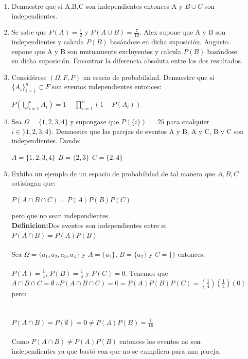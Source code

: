 \documentclass[12pt,a4paper]{report}
\begin{document}
\begin{enumerate}
   \item {
   Demuestre que si A,B,C son independientes entonces A y $B\cup C$ son independientes.
	
    }

   \item {
   Se sabe que $P(A)= \frac{1}{2}$ y $P(A\cup B)=\frac{7}{10}$. Alex supone que A y B son independientes y calcula $P(B)$ basándose en dicha suposición. Augusto supone que A y B son mutuamente excluyentes y calcula $P(B)$ basándose en dicha suposición. Encontrar la diferencia absoluta entre los dos resultados.
	}

   \item {
   Considérese $(\Omega,F, P)$ un esacio de probabilidad. Demuestre que si $\lbrace A_{i} \rbrace _{i=1}^{n} \subset F$ son eventos independientes entonces:\\
   \begin{center}
   $P(\bigcup\limits_{i=1}^{n} A_{i})=1-\prod\limits_{i=1}^{n} (1-P(A_{i}))$
   \end{center}
	}

   \item {
    Sea $\Omega = \lbrace 1,2,3,4 \rbrace$ y supongase que $P(\lbrace i \rbrace)=.25$ para cualquier $i\in \rbrace 1,2,3,4 \rbrace$. Demuestre que las parejas de eventos A y B, A y C, B y C son independientes. Donde:\\
    \begin{center}
    $A=\lbrace 1,2,3,4 \rbrace \ \ B=\lbrace 2,3 \rbrace \ \ C= \lbrace 2,4 \rbrace $
\end{center}     
	}

   \item {
  Exhiba un ejemplo de un espacio de probabilidad de tal manera que $A,B,C$ satisfagan que: \\ 
  \begin{center}
  $P(A\cap B \cap C) = P(A)P(B)P(C)$
  \end{center}
  pero que no sean independientes.\\
  \textbf{Definicion:}Dos eventos son independientes entre si $P(A\cap B)=P(A)P(B)$\\ \\ 
  Sea $\Omega = \lbrace a_{1},a_{2},a_{3},a_{4} \rbrace$
  y $A = \lbrace a_{1} \rbrace$, $B= \lbrace a_{2} \rbrace$ y $C=\lbrace \rbrace$ entonces:\\ \\
  $P(A)=\frac{1}{4}$, $P(B)=\frac{1}{4}$ y $P(C)=0$. Tenemos que $A\cap B \cap C = \emptyset \ \therefore P(A\cap B \cap C)=0=P(A)P(B)P(C)=(\frac{1}{4})(\frac{1}{4})(0)$ pero:\\ \\ \\
  $P(A\cap B)=P(\emptyset)=0 \neq P(A)P(B)= \frac{1}{16}$ \\ \\
 Como $P(A \cap B)\neq P(A) P(B)$ entonces los eventos no son independientes ya que bastó con que no se cumpliera para una pareja.
  }


\end{enumerate}
\end{document}
